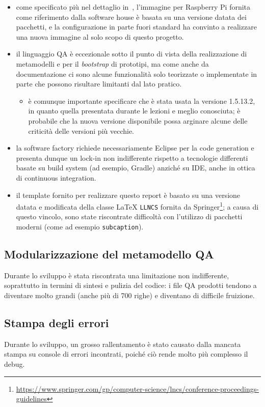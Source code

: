 \begin{itemize}
  \item
    come specificato più nel dettaglio in~,
    l'immagine per Raspberry Pi fornita come riferimento dalla software house è basata su una versione datata dei pacchetti, e la configurazione in parte fuori standard ha convinto a realizzare una nuova immagine al solo scopo di questo progetto.
  \item
    il linguaggio QA è eccezionale sotto il punto di vista della realizzazione di metamodelli e per il \textit{bootstrap} di prototipi, ma come anche da documentazione ci sono alcune funzionalità solo teorizzate o implementate in parte che possono risultare limitanti dal lato pratico.
    \begin{itemize}
      \item
        è comunque importante specificare che è stata usata la versione 1.5.13.2, in quanto quella presentata durante le lezioni e meglio conosciuta;
        è probabile che la nuova versione disponibile possa arginare alcune delle criticità delle versioni più vecchie.
    \end{itemize}
  \item
    la software factory richiede necessariamente Eclipse per la code generation e presenta dunque un lock-in non indifferente rispetto a tecnologie differenti basate su build system (ad esempio, Gradle) anziché su IDE, anche in ottica di continuous integration.
  \item
    il template fornito per realizzare questo report è basato su una versione datata e modificata della classe \LaTeX{} \texttt{LLNCS} fornita da Springer\footnote{\url{https://www.springer.com/gp/computer-science/lncs/conference-proceedings-guidelines}};
    a causa di questo vincolo, sono state riscontrate difficoltà con l'utilizzo di pacchetti moderni (come ad esempio \texttt{subcaption}).
\end{itemize}

\subsection{Modularizzazione del metamodello QA}
Durante lo sviluppo è stata riscontrata una limitazione non indifferente, soprattutto in termini di sintesi e pulizia del codice:
i file QA prodotti tendono a diventare molto grandi (anche più di 700 righe) e diventano di difficile fruizione.

\subsection{Stampa degli errori}
Durante lo sviluppo, un grosso rallentamento è stato causato dalla mancata stampa su console di errori incontrati, poiché ciò rende molto più complesso il debug.

